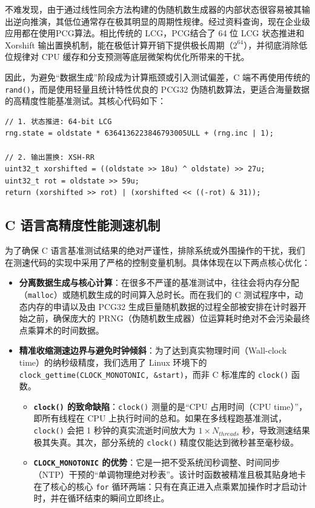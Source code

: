 \documentclass[UTF8]{ctexart}
\begin{document}
不难发现，由于通过线性同余方法构建的伪随机数生成器的内部状态很容易被其输出逆向推演，其低位通常存在极其明显的周期性规律。经过资料查询，现在企业级应用都在使用PCG算法。相比传统的 LCG，PCG结合了 64 位 LCG 状态推进和 Xorshift 输出置换机制，能在极低计算开销下提供极长周期（$2^{64}$），并彻底消除低位规律对 CPU 缓存和分支预测等底层微架构优化所带来的干扰。

因此，为避免“数据生成”阶段成为计算瓶颈或引入测试偏差，C 端不再使用传统的 \texttt{rand()}，而是使用轻量且统计特性优良的 PCG32 伪随机数算法，更适合海量数据的高精度性能基准测试。其核心代码如下：

\begin{lstlisting}
// 1. 状态推进: 64-bit LCG
rng.state = oldstate * 6364136223846793005ULL + (rng.inc | 1);

// 2. 输出置换: XSH-RR
uint32_t xorshifted = ((oldstate >> 18u) ^ oldstate) >> 27u;
uint32_t rot = oldstate >> 59u;
return (xorshifted >> rot) | (xorshifted << ((-rot) & 31));
\end{lstlisting}

\subsection{C 语言高精度性能测速机制}
为了确保 C 语言基准测试结果的绝对严谨性，排除系统或外围操作的干扰，我们在测速代码的实现中采用了严格的控制变量机制。具体体现在以下两点核心优化：

\begin{itemize}
    \item \textbf{分离数据生成与核心计算}：在很多不严谨的基准测试中，往往会将内存分配（\texttt{malloc}）或随机数生成的时间算入总时长。而在我们的 C 测试程序中，动态内存的申请以及由 PCG32 生成巨量随机数据的过程全部被安排在计时器开始之前，确保庞大的 PRNG（伪随机数生成器）位运算耗时绝对不会污染最终点乘算术的时间数据。
    \item \textbf{精准收缩测速边界与避免时钟倾斜}：为了达到真实物理时间（Wall-clock time）的纳秒级精度，我们选用了 Linux 环境下的 \texttt{clock\_gettime(CLOCK\_MONOTONIC, \&start)}，而非 C 标准库的 \texttt{clock()} 函数。
    \begin{itemize}
        \item \textbf{\texttt{clock()} 的致命缺陷}：\texttt{clock()} 测量的是“CPU 占用时间（CPU time）”，即所有线程在 CPU 上执行时间的总和。如果在多线程跑基准测试，\texttt{clock()} 会把 1 秒钟的真实流逝时间放大为 $1 \times N_{threads}$ 秒，导致测速结果极其失真。其次，部分系统的 \texttt{clock()} 精度仅能达到微秒甚至毫秒级。
        \item \textbf{\texttt{CLOCK\_MONOTONIC} 的优势}：它是一把不受系统闰秒调整、时间同步（NTP）干预的“单调物理绝对秒表”。该计时函数被精准且极其贴身地卡在了核心的核心 \texttt{for} 循环两端：只有在真正进入点乘累加操作时才启动计时，并在循环结束的瞬间立即终止。
    \end{itemize}
\end{itemize}
\end{document}
